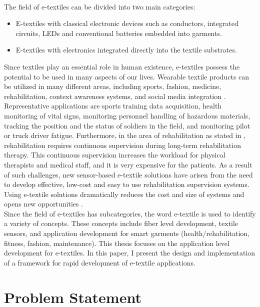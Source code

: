\\
The field of e-textiles can be divided into two main categories:
\begin{itemize}

\item E-textiles with classical electronic devices such as conductors, integrated circuits, LEDs and conventional batteries embedded into garments.
\item E-textiles with electronics integrated directly into the textile substrates.

\end{itemize}

Since textiles play an essential role in human existence, e-textiles possess the potential to be used in many aspects of our lives. Wearable textile products can be utilized in many different areas, including sports, fashion, medicine, rehabilitation, context awareness systems, and social media integration \cite{12}. Representative applications are sports training data acquisition, health monitoring of vital signs, monitoring personnel handling of hazardous materials, tracking the position and the status of soldiers in the field, and monitoring pilot or truck driver fatigue. Furthermore, in the area of rehabilitation as stated in \cite{9}, rehabilitation requires continuous supervision during long-term rehabilitation therapy. This continuous supervision increases the workload for physical therapists and medical staff, and it is very expensive for the patients. As a result of such challenges, new sensor-based e-textile solutions have arisen from the need to develop effective, low-cost and easy to use rehabilitation supervision systems. Using e-textile solutions dramatically reduces the cost and size of systems and opens new opportunities \cite{9}. 
\\
Since the field of e-textiles has subcategories, the word e-textile is used to identify a variety of concepts. These concepts include fiber level development, textile sensors, and application development for smart garments (health/rehabilitation, fitness, fashion, maintenance). This thesis focuses on the application level development for e-textiles. In this paper, I present the design and implementation of a framework for rapid development of e-textile applications. 
\\

\section{Problem Statement} \label{problemStatement}

